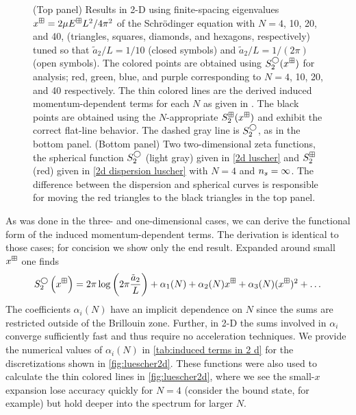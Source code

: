 \begin{figure}
    \center
    
    \caption{
        (Top panel)
        Results in 2-D using finite-spacing eigenvalues $x^\boxplus=2\mu E^\boxplus L^2/4\pi^2$ of the Schr\"odinger equation with $N=4$, 10, 20, and 40, (triangles, squares, diamonds, and hexagons, respectively) tuned so that $\tilde a_{2}/L=1/10$ (closed symbols) and $\tilde a_{2}/L=1/(2\pi)$ (open symbols).
        The colored points are obtained using $S^\bigcirc_2(x^\boxplus)$ for analysis; red, green, blue, and purple corresponding to $N=4$, 10, 20, and 40 respectively.
        The thin colored lines are the derived induced momentum-dependent terms for each $N$ as given in .
        The black points are obtained using the $N$-appropriate $S^{\boxplus}_2(x^\boxplus)$ and exhibit the correct flat-line behavior.
        The dashed gray line is $S_2^\bigcirc$, as in the bottom panel.
        (Bottom panel)
        Two two-dimensional zeta functions, the spherical function $S_2^{\bigcirc}$ (light gray) given in \eqref{2d luscher} and $S_2^{\boxplus}$ (red) given in \eqref{2d dispersion luscher} with $N=4$ and ${n_s}=\infty$.
        The difference between the dispersion and spherical curves is responsible for moving the red triangles to the black triangles in the top panel.
        }
    \label{fig:luescher2d}
\end{figure}

As was done in the three- and one-dimensional cases, we can derive the functional form of the induced momentum-dependent terms.
The derivation is identical to those cases; for concision we show only the end result.
Expanded around small $x^\boxplus$ one finds
\begin{equation}
    \label{eq:2D corrections}
    S^\bigcirc_{2}\left(x^\boxplus\right)
    =
    2\pi\log\left(2\pi \frac{\tilde a_{2}}{L}\right)
    + \alpha_1(N)
    + \alpha_2(N) x^\boxplus
    + \alpha_3(N) (x^\boxplus)^2
    + \ldots
\end{equation}
The coefficients $\alpha_i(N)$ have an implicit dependence on $N$ since the sums are restricted outside of the Brillouin zone.  Further, in 2-D the sums involved in $\alpha_i$ converge sufficiently fast and thus require no acceleration techniques.
We provide the numerical values of $\alpha_i(N)$ in \autoref{tab:induced terms in 2 d} for the discretizations shown in \autoref{fig:luescher2d}.
These functions were also used to calculate the thin colored lines in \autoref{fig:luescher2d}, where we see the small-$x$ expansion lose accuracy quickly for $N=4$ (consider the bound state, for example) but hold deeper into the spectrum for larger $N$.

